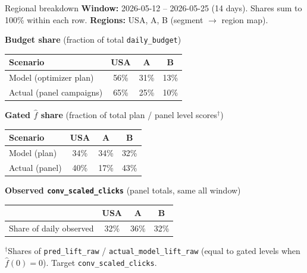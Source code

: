 \documentclass[11pt]{beamer}
\begin{document}
\begin{frame}{Regional breakdown}
  \footnotesize
  \textbf{Window:} 2026-05-12 -- 2026-05-25 (14 days). Shares sum to 100\% within each row.
  \textbf{Regions:} USA, A, B (segment $\rightarrow$ region map).

  \vspace{0.35em}
  \centering
  \textbf{Budget share} (fraction of total \texttt{daily\_budget})
  \begin{tabular}{lccc}
    \toprule
    Scenario & USA & A & B \\
    \midrule
    Model (optimizer plan) & 56\% & 31\% & 13\% \\
    Actual (panel campaigns) & 65\% & 25\% & 10\% \\
    \bottomrule
  \end{tabular}

  \vspace{0.45em}
  \textbf{Gated $\hat f$ share} (fraction of total plan / panel level scores$^\dagger$)
  \begin{tabular}{lccc}
    \toprule
    Scenario & USA & A & B \\
    \midrule
    Model (plan) & 34\% & 34\% & 32\% \\
    Actual (panel) & 40\% & 17\% & 43\% \\
    \bottomrule
  \end{tabular}

  \vspace{0.45em}
  \textbf{Observed \texttt{conv\_scaled\_clicks}} (panel totals, same all window)
  \begin{tabular}{lccc}
    \toprule
    & USA & A & B \\
    \midrule
    Share of daily observed & 32\% & 36\% & 32\% \\
    \bottomrule
  \end{tabular}

  \vspace{0.3em}
  \raggedright
  {\scriptsize $^\dagger$Shares of \texttt{pred\_lift\_raw} / \texttt{actual\_model\_lift\_raw} (equal to gated levels when $\hat f(0){=}0$). Target \texttt{conv\_scaled\_clicks}.}
\end{frame}
\end{document}

